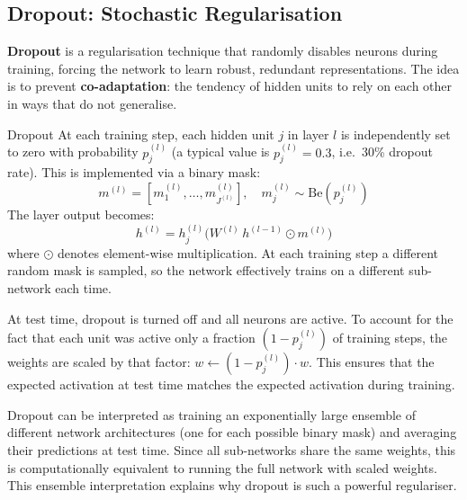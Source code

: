 \documentclass[11pt,a4paper]{article}
\newcommand{\term}[1]{\textcolor{DefGreen}{\textbf{#1}}\index{#1}}
\begin{document}
\subsection{Dropout: Stochastic Regularisation}

\term{Dropout} is a regularisation technique that randomly disables neurons during training, forcing the network to learn robust, redundant representations. The idea is to prevent \term{co-adaptation}: the tendency of hidden units to rely on each other in ways that do not generalise.

\begin{defbox}{Dropout}
At each training step, each hidden unit $j$ in layer $l$ is independently set to zero with probability $p_j^{(l)}$ (a typical value is $p_j^{(l)} = 0.3$, i.e.\ 30\% dropout rate). This is implemented via a binary mask:
\[
m^{(l)} = [m_1^{(l)}, \ldots, m_{J^{(l)}}^{(l)}], \quad m_j^{(l)} \sim \mathrm{Be}(p_j^{(l)})
\]
The layer output becomes:
\[
h^{(l)} = h_j^{(l)}\bigl(W^{(l)}\, h^{(l-1)} \odot m^{(l)}\bigr)
\]
where $\odot$ denotes element-wise multiplication. At each training step a different random mask is sampled, so the network effectively trains on a different sub-network each time.
\end{defbox}

At test time, dropout is turned off and all neurons are active. To account for the fact that each unit was active only a fraction $(1-p_j^{(l)})$ of training steps, the weights are scaled by that factor: $w \leftarrow (1 - p_j^{(l)}) \cdot w$. This ensures that the expected activation at test time matches the expected activation during training.

\begin{insightbox}
Dropout can be interpreted as training an exponentially large ensemble of different network architectures (one for each possible binary mask) and averaging their predictions at test time. Since all sub-networks share the same weights, this is computationally equivalent to running the full network with scaled weights. This ensemble interpretation explains why dropout is such a powerful regulariser.
\end{insightbox}
\end{document}

